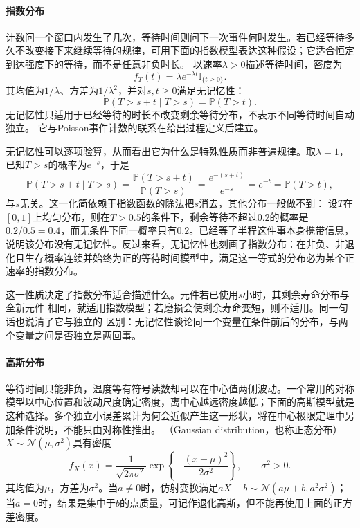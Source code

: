 \paragraph{指数分布}
计数问一个窗口内发生了几次，等待时间则问下一次事件何时发生。若已经等待多久不改变接下来继续等待的规律，可用下面的指数模型表达这种假设；它适合恒定到达强度下的等待，而不是任意非负时长。
以速率\(\lambda>0\)描述等待时间，密度为
\[
f_T(t)=\lambda e^{-\lambda t}\mathbb I_{\{t\geq0\}}.
\]
其均值为\(1/\lambda\)、方差为\(1/\lambda^2\)，并对\(s,t\geq0\)满足无记忆性：
\[ \mathbb{P}(T>s+t\mid T>s)=\mathbb{P}(T>t). \]
无记忆性只适用于已经等待的时长不改变剩余等待分布，不表示不同等待时间自动独立。
它与Poisson事件计数的联系在给出过程定义后建立。

无记忆性可以逐项验算，从而看出它为什么是特殊性质而非普遍规律。取\(\lambda=1\)，
已知\(T>s\)的概率为\(e^{-s}\)，于是
\[
  \mathbb{P}(T>s+t\mid T>s)
  =\frac{\mathbb{P}(T>s+t)}{\mathbb{P}(T>s)}
  =\frac{e^{-(s+t)}}{e^{-s}}=e^{-t}
  =\mathbb{P}(T>t),
\]
与\(s\)无关。这一化简依赖于指数函数的除法把\(s\)消去，其他分布一般做不到：
设\(T\)在\([0,1]\)上均匀分布，则在\(T>0.5\)的条件下，剩余等待不超过\(0.2\)的概率是
\(0.2/0.5=0.4\)，而无条件下同一概率只有\(0.2\)。已经等了半程这件事本身携带信息，
说明该分布没有无记忆性。反过来看，无记忆性也刻画了指数分布：在非负、非退化且生存概率连续并始终为正的等待时间模型中，满足这一等式的分布必为某个正速率的指数分布。

这一性质决定了指数分布适合描述什么。元件若已使用\(s\)小时，其剩余寿命分布与全新元件
相同，就适用指数模型；若磨损会使剩余寿命变短，则不适用。同一句话也说清了它与独立的
区别：无记忆性谈论同一个变量在条件前后的分布，与两个变量之间是否独立是两回事。

\paragraph{高斯分布}
等待时间只能非负，温度等有符号读数却可以在中心值两侧波动。一个常用的对称模型以中心位置和波动尺度确定密度，离中心越远密度越低；下面的高斯模型就是这种选择。多个独立小误差累计为何会近似产生这一形状，将在中心极限定理中另加条件说明，不能只由对称性推出。
（Gaussian distribution，也称正态分布）
\(X\sim\mathcal{N}(\mu,\sigma^2)\)具有密度
\[ f_X(x)
  =\frac{1}{\sqrt{2\pi\sigma^2}}\exp\left\{-\frac{(x-\mu)^2}{2\sigma^2}\right\},\qquad \sigma^2>0. \]
其均值为\(\mu\)，方差为\(\sigma^2\)。当\(a\neq0\)时，仿射变换满足\(aX+b\sim\mathcal{N}(a\mu+b,a^2\sigma^2)\)；当\(a=0\)时，结果是集中于\(b\)的点质量，可记作退化高斯，但不能再使用上面的正方差密度。

